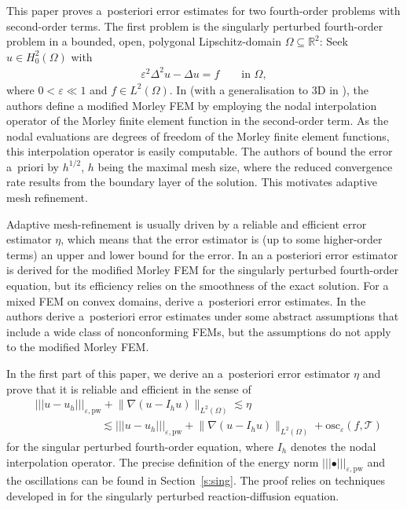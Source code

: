 \documentclass[a4paper]{amsart}
\theoremstyle{definition}
\numberwithin{equation}{section}
\numberwithin{theorem}{section}
\newcommand{\R}{\mathbb{R}}
\newcommand{\pw}{\mathrm{pw}}
\newcommand{\osc}{\mathrm{osc}}
\newcommand{\tri}{\mathcal{T}}
\newcommand{\ennorm}[1]{\lvert\!\lvert\!\lvert #1 \rvert\!\rvert\!\rvert}
\begin{document}
This paper proves a~posteriori error estimates for two 
fourth-order problems with second-order terms.
The first problem is the singularly perturbed 
fourth-order problem
in a bounded, open, polygonal Lipschitz-domain $\Omega\subseteq \R^2$:
Seek $u\in H^2_0(\Omega)$ with 
\begin{align}\label{e:intro_sing_pert_strong_form}
    \varepsilon^2 \Delta^2 u -\Delta u = f 
    \qquad \text{in }\Omega,
\end{align}
where $0<\varepsilon\ll 1$ and $f\in L^2(\Omega)$.
In \cite{WangXuHu2006} (with a generalisation to 3D in 
\cite{WangMeng2007}), the authors define
a modified Morley FEM by employing  
the nodal interpolation operator of the Morley 
finite element function in the second-order term.
As the nodal evaluations are degrees of freedom of 
the Morley finite element functions, this interpolation 
operator is easily computable.
The authors of \cite{WangXuHu2006}
bound the error a~priori by $h^{1/2}$, $h$ being
the maximal mesh size, where the 
reduced convergence rate results from the boundary layer 
of the solution. This motivates adaptive mesh refinement.

Adaptive mesh-refinement is usually driven by a reliable 
and efficient error estimator $\eta$, which means that 
the error estimator is (up to some higher-order terms) 
an upper and lower bound for the error.
%
In \cite{ZhangWang2008} an a posteriori error estimator 
is derived for the modified Morley FEM for the singularly 
perturbed fourth-order equation, but its efficiency relies 
on the smoothness of the exact solution.
For a mixed FEM on convex domains, \cite{DuLinZhang2022} derive a~posteriori 
error estimates.
In \cite{GallistlTian2024} the authors derive a~posteriori 
error estimates under some abstract assumptions that include 
a wide class of nonconforming FEMs, but the assumptions 
do not apply to the modified Morley FEM.

In the first part of this paper, we derive an a~posteriori error estimator 
$\eta$ and prove that it is reliable and efficient in the sense of 
\begin{align*}
    &\ennorm{u-u_h}_{\varepsilon,\pw} + \lVert \nabla(u-I_h u)\rVert_{L^2(\Omega)}
    \lesssim \eta \\
    &\qquad\qquad\qquad
    \lesssim \ennorm{u-u_h}_{\varepsilon,\pw} 
      + \lVert \nabla(u-I_h u)\rVert_{L^2(\Omega)}
      + \osc_\varepsilon(f,\tri)
\end{align*}
for the singular perturbed
fourth-order equation, where $I_h$ denotes the nodal 
interpolation operator. The precise definition of the energy
norm $\ennorm{\bullet}_{\varepsilon,\pw}$ and the oscillations
can be found in Section~\ref{s:sing}.
The proof relies on techniques developed in 
\cite{Verfuerth1998} for the singularly perturbed 
reaction-diffusion equation.
\end{document}
